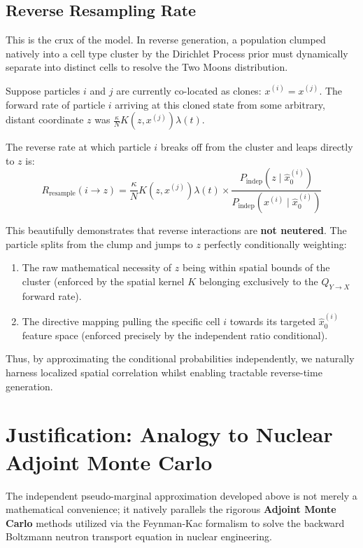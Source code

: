 \documentclass[11pt]{article}
\begin{document}
\subsection{Reverse Resampling Rate}
This is the crux of the model. In reverse generation, a population clumped natively into a cell type cluster by the Dirichlet Process prior must dynamically separate into distinct cells to resolve the Two Moons distribution.

Suppose particles $i$ and $j$ are currently co-located as clones: $x^{(i)} = x^{(j)}$. The forward rate of particle $i$ arriving at this cloned state from some arbitrary, distant coordinate $z$ was $\frac{\kappa}{N} K(z, x^{(j)}) \lambda(t)$. 

The reverse rate at which particle $i$ breaks off from the cluster and leaps directly to $z$ is:
\[
    R_{\text{resample}}(i \to z) = \frac{\kappa}{N} K(z, x^{(j)}) \lambda(t) \times \frac{P_{\text{indep}}(z \mid \hat{x}_0^{(i)})}{P_{\text{indep}}(x^{(i)} \mid \hat{x}_0^{(i)})}
\]

This beautifully demonstrates that reverse interactions are \textbf{not neutered}. The particle splits from the clump and jumps to $z$ perfectly conditionally weighting:
\begin{enumerate}
    \item The raw mathematical necessity of $z$ being within spatial bounds of the cluster (enforced by the spatial kernel $K$ belonging exclusively to the $Q_{Y \to X}$ forward rate).
    \item The directive mapping pulling the specific cell $i$ towards its targeted $\hat{x}_0^{(i)}$ feature space (enforced precisely by the independent ratio conditional).
\end{enumerate}

Thus, by approximating the conditional probabilities independently, we naturally harness localized spatial correlation whilst enabling tractable reverse-time generation.

\section{Justification: Analogy to Nuclear Adjoint Monte Carlo}

The independent pseudo-marginal approximation developed above is not merely a mathematical convenience; it natively parallels the rigorous \textbf{Adjoint Monte Carlo} methods utilized via the Feynman-Kac formalism to solve the backward Boltzmann neutron transport equation in nuclear engineering.
\end{document}
